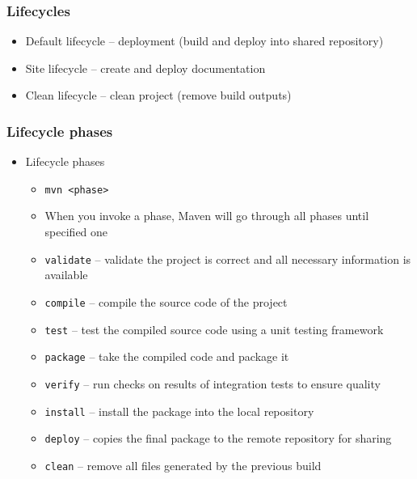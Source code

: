 \documentclass[10pt,xcolor=pdflatex]{beamer}
\begin{document}
\begin{frame}\frametitle{Lifecycles}
\begin{itemize}
  \item Default lifecycle -- deployment (build and deploy into shared repository)
  \item Site lifecycle -- create and deploy documentation
  \item Clean lifecycle -- clean project (remove build outputs)
\end{itemize}
\end{frame}


\begin{frame}\frametitle{Lifecycle phases}
\begin{itemize}
    \item Lifecycle phases
	  \begin{itemize}
		\item \texttt{mvn <phase>}
        \item When you invoke a phase, Maven will go through all phases until specified one
        \item \texttt{validate} -- {\footnotesize validate the project is correct and all necessary information is available}
        \item \texttt{compile} -- {\footnotesize compile the source code of the project}
        \item \texttt{test} -- {\footnotesize test the compiled source code using a unit testing framework}
        \item \texttt{package} -- {\footnotesize take the compiled code and package it}
        \item \texttt{verify} -- {\footnotesize run checks on results of integration tests to ensure quality}
        \item \texttt{install} -- {\footnotesize install the package into the local repository}
        \item \texttt{deploy} -- {\footnotesize copies the final package to the remote repository for sharing}
		\item \texttt{clean} -- {\footnotesize remove all files generated by the previous build}
	  \end{itemize}
\end{itemize}
\end{frame}
\end{document}
